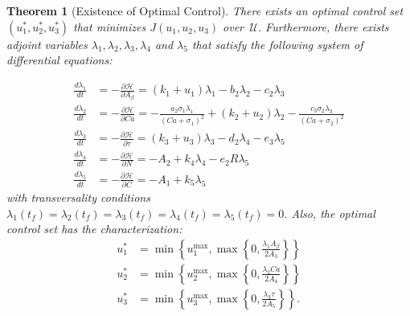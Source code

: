 \documentclass[12pt]{article}
\newtheorem{thm}{Theorem}
\theoremstyle{definition}
\begin{document}
\begin{thm}[Existence of Optimal Control]
    There exists an optimal control set $(u_1^*, u_2^*, u_3^*)$ that minimizes $J(u_1, u_2, u_3)$ over $\,\mathcal U$. Furthermore, there exists adjoint variables $\lambda_1, \lambda_2, \lambda_3, \lambda_4$ and $\lambda_5$ that satisfy the following system of differential equations:

    \begin{equation}
    \label{eq:adjoints}
    \begin{split}
        \frac{d\lambda_1}{dt} &= -\frac{\partial \mathcal H}{\partial A_\beta} =  (k_1 + u_1) \lambda_1 - b_2 \lambda_2 - c_2 \lambda_3 \\
        \frac{d\lambda_2}{dt} &= -\frac{\partial \mathcal H}{\partial Ca} = -\frac{a_2 \sigma_1 \lambda_1}{(Ca + \sigma_1)^2} + (k_2 + u_2)\lambda_2 - \frac{c_3 \sigma_2 \lambda_3}{(Ca + \sigma_2)^2} \\
        \frac{d\lambda_3}{dt} &= -\frac{\partial \mathcal H}{\partial \tau} = (k_3 + u_3) \lambda_3 - d_2 \lambda_4 - e_3 \lambda_5 \\
        \frac{d\lambda_4}{dt} &= -\frac{\partial \mathcal H}{\partial N} = -A_2 + k_4 \lambda_4 - e_2 R \lambda_5\\
        \frac{d\lambda_5}{dt} &= -\frac{\partial \mathcal H}{\partial C} = -A_1 + k_5 \lambda_5
    \end{split}
    \end{equation}
    with transversality conditions $\lambda_1 (t_f) = \lambda_2 (t_f) = \lambda_3 (t_f) = \lambda_4 (t_f) = \lambda_5(t_f) = 0$. Also, the optimal control set has the characterization:
    \begin{align*}
    \label{eq:characterizations}
        u_1^* &= \min \left\{ u_1^{\max}, \max \left\{ 0, \frac{\lambda_1 A_\beta}{2 A_3} \right\} \right\} \\
        u_2^* &= \min \left\{ u_2^{\max}, \max \left\{ 0, \frac{\lambda_2 Ca}{2 A_4} \right\} \right\} \\
        u_3^* &= \min \left\{ u_3^{\max}, \max \left\{ 0, \frac{\lambda_3 \tau}{2 A_5} \right\} \right\}.
    \end{align*}
\end{thm} \bigskip 
\end{document}
